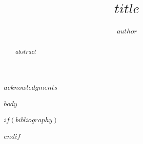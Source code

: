 \documentclass[phd]{nuthesis}
\title{$title$}
\author{$author$}
\begin{document}
\maketitle

\begin{abstract}
$abstract$
\end{abstract}

\begin{acknowledgments}
$acknowledgments$
\end{acknowledgments}

\tableofcontents
\listoffigures
\listoftables

\mainmatter

$body$

\backmatter

$if(bibliography)$


$endif$
\end{document}
